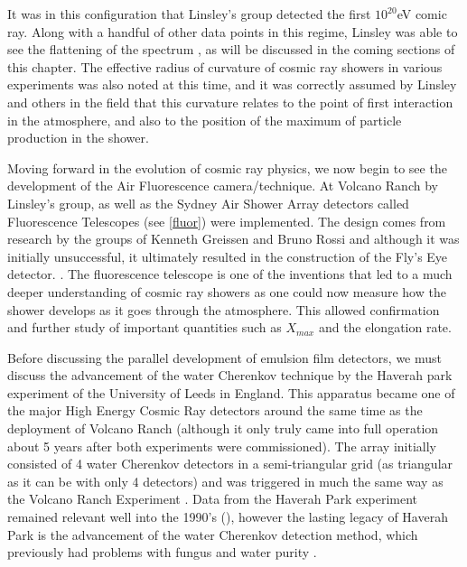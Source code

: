It was in this configuration that Linsley's group detected the first $10^{20}$eV comic ray. Along with a handful of other data points in this regime, Linsley was able to see the flattening of the spectrum \cite{volranch}, as will be discussed in the coming sections of this chapter. The effective radius of curvature of cosmic ray showers in various experiments was also noted at this time, and it was correctly assumed by Linsley and others in the field that this curvature relates to the point of first interaction in the atmosphere, and also to the position of the maximum of particle production in the shower.

Moving forward in the evolution of cosmic ray physics, we now begin to see the development of the Air Fluorescence camera/technique. At Volcano Ranch by Linsley's group, as well as the Sydney Air Shower Array detectors called Fluorescence Telescopes (see \autoref{fluor}) were implemented. The design comes from research by the groups of Kenneth Greissen and Bruno Rossi and although it was initially unsuccessful, it ultimately resulted in the construction of the Fly's Eye detector. \cite{ultraray}. The fluorescence telescope is one of the inventions that led to a much deeper understanding of cosmic ray showers as one could now measure how the shower develops as it goes through the atmosphere. This allowed confirmation and further study of important quantities such as $X_{max}$ and the elongation rate. 

Before discussing the parallel development of emulsion film detectors, we must discuss the advancement of the water Cherenkov technique by the Haverah park experiment of the University of Leeds in England. This apparatus became one of the major High Energy Cosmic Ray detectors around the same time as the deployment of Volcano Ranch (although it only truly came into full operation about 5 years after both experiments were commissioned). The array initially consisted of 4 water Cherenkov detectors in a semi-triangular grid (as triangular as it can be with only 4 detectors) and was triggered in much the same way as the Volcano Ranch Experiment \cite{haverah_lillicrap}. Data from the Haverah Park experiment remained relevant well into the 1990's (\cite{haverah_watson}), however the lasting legacy of Haverah Park is the advancement of the water Cherenkov detection method, which previously had problems with fungus and water purity \cite{haverah_who}.


